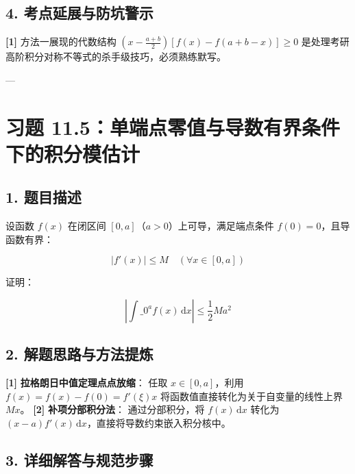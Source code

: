 \documentclass[11pt,a4paper,UTF8]{ctexart}
\begin{document}
\subsection{4. 考点延展与防坑警示}
\begin{solbox}[分步推导与答题规范]
\textbf{[1]}  方法一展现的代数结构 $\left(x - \frac{a+b}{2}\right)[f(x) - f(a+b-x)] \ge 0$ 是处理考研高阶积分对称不等式的杀手级技巧，必须熟练默写。
\end{solbox}

---


\section{习题 11.5：单端点零值与导数有界条件下的积分模估计}


\subsection{1. 题目描述}
设函数 $f(x)$ 在闭区间 $[0, a]$（$a > 0$）上可导，满足端点条件 $f(0) = 0$，且导函数有界：

\begin{equation*}
|f'(x)| \le M \quad (\forall x \in [0, a])
\end{equation*}

证明：

\begin{equation*}
\left| \int\_0^a f(x)\,\mathrm{d}x \right| \le \frac{1}{2} M a^2
\end{equation*}



\subsection{2. 解题思路与方法提炼}
\begin{solbox}[分步推导与答题规范]
\textbf{[1]}  \textbf{拉格朗日中值定理点点放缩}：
任取 $x \in [0, a]$，利用 $f(x) = f(x) - f(0) = f'(\xi)x$ 将函数值直接转化为关于自变量的线性上界 $Mx$。
\textbf{[2]}  \textbf{补项分部积分法}：
通过分部积分，将 $f(x)\,\mathrm{d}x$ 转化为 $(x-a)f'(x)\,\mathrm{d}x$，直接将导数约束嵌入积分核中。
\end{solbox}


\subsection{3. 详细解答与规范步骤}
\end{document}
